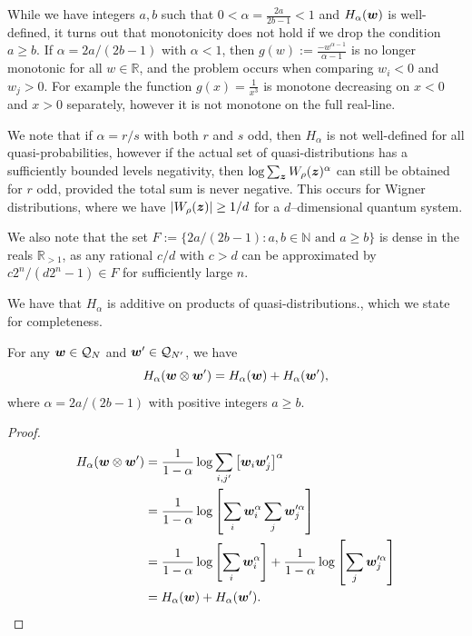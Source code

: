 \documentclass[pra,
aps,
twocolumn,
superscriptaddress,
groupedaddress,
nofootinbib,
reprint
]{revtex4-1}
\begin{document}
While we have integers $a,b$ such that $0 < \alpha=\frac{2a}{2b-1} < 1$ and $H_\alpha(\boldsymbol{w})$ is well-defined, it turns out that monotonicity does not hold if we drop the condition $a \ge b$. If $\alpha =2a/(2b-1)$ with $\alpha < 1$, then $g(w) := \frac{-w^{\alpha-1}}{\alpha-1}$ is no longer monotonic for all $w \in \mathbb{R}$, and the problem occurs when comparing $w_i < 0$ and $w_j >0$. For example the function $g(x) = \frac{1}{x^3}$ is monotone decreasing on $x<0$ and $x>0$ separately, however it is not monotone on the full real-line.

We note that if $\alpha =r/s$ with both $r$ and $s$ odd, then $H_\alpha$ is not well-defined for all quasi-probabilities, however if the actual set of quasi-distributions has a sufficiently bounded levels negativity, then $\log \sum_{\bm{z}} W_\rho(\bm{z})^\alpha$ can still be obtained for $r$ odd, provided the total sum is never negative. This occurs for Wigner distributions, where we have $|W_\rho(\boldsymbol{z})| \ge 1/d$ for a $d$--dimensional quantum system.

We also note that the set $F := \{2a/(2b-1): a,b \in \mathbb{N} \text{ and } a \geq b\}$ is dense in the reals $\mathbb{R}_{>1}$, as any rational $c/d$ with $c>d$ can be approximated by  $c2^n / (d2^n-1) \in F$ for sufficiently large $n$.

We have that $H_{\alpha}$ is additive on products of quasi-distributions., which we state for completeness.
\begin{lemma}\label{H_add}
	For any $\boldsymbol{w} \in \mathcal{Q}_N$ and $\boldsymbol{w}' \in \mathcal{Q}_{N'}$, we have
	\begin{equation}
		H_{\alpha}(\boldsymbol{w}\otimes \boldsymbol{w}') = H_{\alpha}(\boldsymbol{w}) + H_{\alpha}(\boldsymbol{w}'),
	\end{equation}
	where $\alpha = 2a/(2b-1)$ with positive integers $a\ge b$.
\end{lemma}
\begin{proof}
	\begin{align*}
		H_{\alpha}(\boldsymbol{w} \otimes \boldsymbol{w}') &= \frac{1}{1-\alpha}\log \sum_{i,j'} \left[\boldsymbol{w}_i \boldsymbol{w}'_j\right]^{\alpha} \\
		&= \frac{1}{1-\alpha}\log  \left [ \sum_i\boldsymbol{w}_i^\alpha \sum_j\boldsymbol{w}_j^{\prime \alpha} \right ] \\
				&= \frac{1}{1-\alpha}\log  \left [ \sum_i\boldsymbol{w}_i^\alpha\right ] + \frac{1}{1-\alpha}\log \left [ \sum_j\boldsymbol{w}_j^{\prime \alpha} \right ] \\
		&= H_{\alpha}(\boldsymbol{w}) + H_{\alpha}(\boldsymbol{w}').
	\end{align*}
\end{proof}
\end{document}
